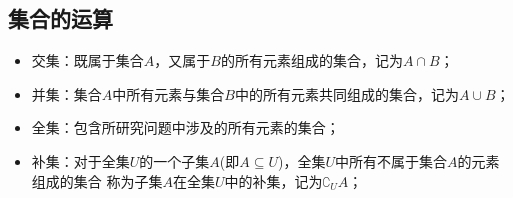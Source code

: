   \subsection{集合的运算}
    \begin{itemize}
      \item {\fangsong 交集}：既属于集合$A$，又属于$B$的所有元素组成的集合，记为$A\cap B$；
      \item {\fangsong 并集}：集合$A$中所有元素与集合$B$中的所有元素共同组成的集合，记为$A\cup B$；
      \item {\fangsong 全集}：包含所研究问题中涉及的所有元素的集合；
      \item {\fangsong 补集}：对于全集$U$的一个子集$A$(即$A\subseteq U$)，全集$U$中所有不属于集合$A$的元素组成的集合
        称为子集$A$在全集$U$中的补集，记为$\complement_UA$；
    \end{itemize}
